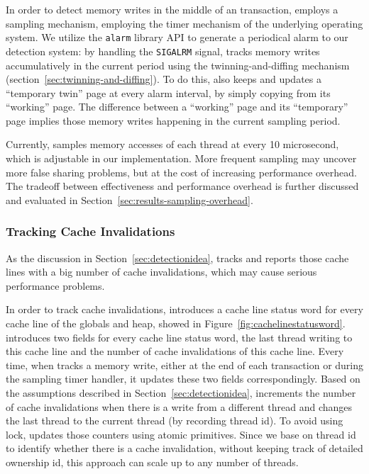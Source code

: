 In order to detect memory writes in the middle of an transaction, \SheriffDetect{} employs a sampling mechanism, employing the timer mechanism of the underlying operating system. 
We utilize the \texttt{alarm} library API to generate a periodical alarm to our detection system: by handling the \texttt{SIGALRM} signal, \SheriffDetect{} tracks memory writes accumulatively in the current period using the twinning-and-diffing mechanism (section~\ref{sec:twinning-and-diffing}). To do this, \SheriffDetect{} also keeps and updates a ``temporary twin'' page at every alarm interval, by simply copying from its ``working'' page. The difference between a ``working'' page and its ``temporary'' page implies those memory writes happening in the current sampling period. 

Currently, \SheriffDetect{} samples memory accesses of each thread at every 10 microsecond, which is  adjustable in our implementation. More frequent sampling may uncover more false sharing problems, but at the cost of increasing performance overhead. The tradeoff between effectiveness and performance overhead is further discussed and evaluated in Section~\ref{sec:results-sampling-overhead}. 

\subsubsection{Tracking Cache Invalidations}
\label{sec:invalidation}
As the discussion in Section~\ref{sec:detectionidea}, \SheriffDetect{} tracks and reports those cache lines with a big number of cache invalidations, which may cause serious performance problems. 

In order to track cache invalidations, \SheriffDetect{} introduces a cache line status word for every cache line of the globals and heap, showed in Figure~\ref{fig:cachelinestatusword}.  \SheriffDetect{} introduces two fields for every cache line status word, the last thread writing to this cache line and the number of cache invalidations of this cache line. 
Every time, when \SheriffDetect{} tracks a memory write, either at the end of each transaction or during the sampling timer handler, it updates these two fields correspondingly. Based on the assumptions described in Section~\ref{sec:detectionidea}, \SheriffDetect{} increments the number of cache invalidations when there is a write from a different thread and changes the last thread to the current thread (by recording thread id). To avoid using lock, \SheriffDetect{} updates those counters using atomic primitives. Since we base on thread id to identify whether there is a cache invalidation, without keeping track of detailed ownership id, this approach can scale up to any number of threads.   

